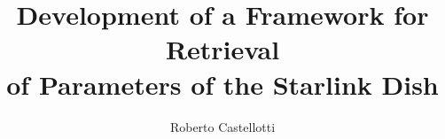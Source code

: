 \usepackage[utf8]{inputenc}
\usepackage{packages}
\usepackage{beamermods}

\author[Roberto Castellotti]{Roberto Castellotti}
\title[IDP]{Development of a Framework for Retrieval \\ of Parameters of the Starlink Dish}


\usepackage{pgfpages}
\usepackage{ifthen}
\newif\ifsolution%

\makeatletter
\let\@@magyar@captionfix\relax
\makeatother
